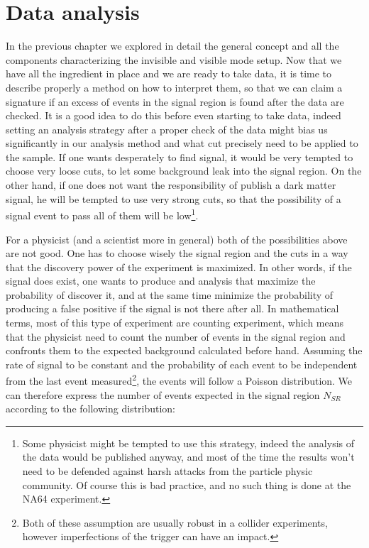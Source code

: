 
\newcommand{\pdirthree}{chapters/plots/chapter3}

\chapter{Data analysis} %
\label{chapter3} %


In the previous chapter we explored in detail the general concept and all the components characterizing the invisible and visible mode setup. Now that we have all the ingredient in place and we are ready to take data, it is time to describe properly a method on how to interpret them, so that we can claim a signature if an excess of events in the signal region is found after the data are checked. It is a good idea to do this before even starting to take data, indeed setting an analysis strategy after a proper check of the data might bias us significantly in our analysis method and what cut precisely need to be applied to the sample. If one wants desperately to find signal, it would be very tempted to choose very loose cuts, to let some background leak into the signal region. On the other hand, if one does not want the responsibility of publish a dark matter signal, he will be tempted to use very strong cuts, so that the possibility of a signal event to pass all of them will be low\footnote{Some physicist might be tempted to use this strategy, indeed the analysis of the data would be published anyway, and most of the time the results won't need to be defended against harsh attacks from the particle physic community. Of course this is bad practice, and no such thing is done at the NA64 experiment.}.

For a physicist (and a scientist more in general) both of the possibilities above are not good. One has to choose wisely the signal region and the cuts in a way that the discovery power of the experiment is maximized. In other words, if the signal does exist, one wants to produce and analysis that maximize the probability of discover it, and at the same time minimize the probability of producing a false positive if the signal is not there after all. In mathematical terms, most of this type of experiment are counting experiment, which means that the physicist need to count the number of events in the signal region and confronts them to the expected background calculated before hand. Assuming the rate of signal to be constant and the probability of each event to be independent from the last event measured\footnote{Both of these assumption are usually robust in a collider experiments, however imperfections of the trigger can have an impact.}, the events will follow a Poisson distribution. We can therefore express the number of events expected in the signal region $N_{SR}$ according to the following distribution:

